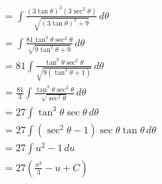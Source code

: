 \documentclass[preview]{standalone}
\begin{document}
\begin{align*}
&= \int \frac{(3\tan\theta)^3(3\sec^2\theta)}{\sqrt{(3\tan\theta)^2+9}} \, d\theta \\ &= \int \frac{81\tan^3\theta\sec^2\theta}{\sqrt{9\tan^2\theta+9}} \, d\theta \\ &= 81\int \frac{\tan^3\theta\sec^2\theta}{\sqrt{9(\tan^2\theta+1)}} \, d\theta \\ &= \frac{81}{3}\int \frac{\tan^3\theta\sec^2\theta}{\sqrt{\sec^2\theta}} \, d\theta \\ &= 27\int \tan^3\theta\sec\theta \, d\theta \\ &= 27\int (\sec^2\theta-1)\sec\theta\tan\theta \, d\theta \\ &=27\int u^2-1 \, du \\ &=27(\frac{x^3}{3}-u+C)
\end{align*}
\end{document}
